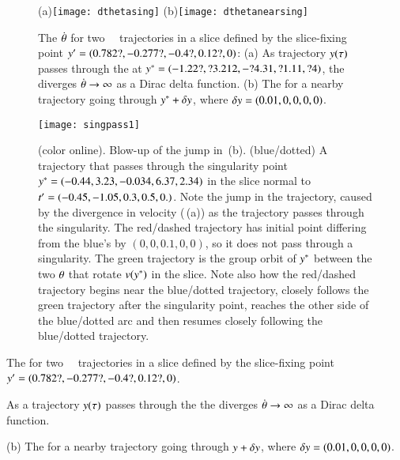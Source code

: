  \begin{figure}
 \begin{center}
(a)\texttt{[image: dthetasing]}%
(b)\texttt{[image: dthetanearsing]}%
 \end{center}
 \caption{\label{fig:dthetasing}
The {\groupVel} $\dot{{\bf \theta}}$ for two \cLf\
\reducedsp\ trajectories in a slice defined by the slice-fixing
point ${y'}=(0.782?,-0.277?,-0.4?,0.12?,0)$:
 (a) As trajectory $y(\tau)$ passes through the
{\sset} 
 at $y^*=(-1.22?, ?3.212, -?4.31, ?1.11, ?4)$,
the {\groupVel} diverges
$\dot{{\bf \theta}} \to \infty$ as a Dirac delta function.
(b) The {\groupVel} for a nearby trajectory going
through $y^*+\delta y$,
where $\delta y=(0.01,0,0,0,0)$.
 }%
 \end{figure}

 \begin{figure}
 \begin{center}
\texttt{[image: singpass1]}
 \end{center}
 \caption{\label{fig:singpass}
(color online).
Blow-up of the jump in \,(b).
(blue/dotted) A trajectory that passes through the singularity point
$y^*=(-0.44, 3.23, -0.034, 6.37, 2.34)$ in the slice normal to
$t'_{}=(-0.45, -1.05, 0.3, 0.5, 0.)$.
Note the jump in the trajectory,  caused by the divergence in
velocity (\,(a)) as the trajectory
passes through the singularity. The red/dashed trajectory has initial
point differing from the blue's by $(0,0,0.1,0,0)$, so it does not pass
through a singularity. The green trajectory is the group orbit of
$y^*$ between the two ${\bf \theta}$ that rotate $v(y^*)$ in the
slice. Note also how the red/dashed trajectory begins near the
blue/dotted trajectory, closely follows the green trajectory after the
singularity point, reaches the other side of the blue/dotted arc and then
resumes closely following the blue/dotted trajectory.
 }%
 \end{figure}



The {\groupVel} for two \cLf\
\reducedsp\ trajectories in a slice defined by the slice-fixing
point ${y'}=(0.782?,-0.277?,-0.4?,0.12?,0)$.

As a trajectory $y(\tau)$ passes through the
{\sset} 
the {\groupVel} diverges
$\dot{{\bf \theta}} \to \infty$ as a Dirac delta function.

(b) The {\groupVel} for a nearby trajectory going
through $y+\delta y$,
where $\delta y=(0.01,0,0,0,0)$.




%
